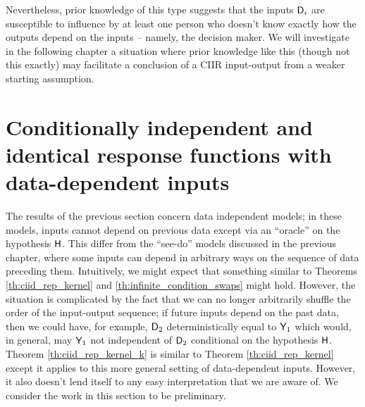 Nevertheless, prior knowledge of this type suggests that the inputs $\mathsf{D}_i$ are susceptible to influence by at least one person who doesn't know exactly how the outputs depend on the inputs -- namely, the decision maker. We will investigate in the following chapter a situation where prior knowledge like this (though not this exactly) may facilitate a conclusion of a CIIR input-output from a weaker starting assumption.

\section[Data-dependent inputs]{Conditionally independent and identical response functions with data-dependent inputs}\label{sec:data_dependent}

The results of the previous section concern data independent models; in these models, inputs cannot depend on previous data except via an ``oracle'' on the hypothesis $\mathsf{H}$. This differ from the ``see-do'' models discussed in the previous chapter, where some inputs can depend in arbitrary ways on the sequence of data preceding them. Intuitively, we might expect that something similar to Theorems \ref{th:ciid_rep_kernel} and \ref{th:infinite_condition_swaps} might hold. However, the situation is complicated by the fact that we can no longer arbitrarily shuffle the order of the input-output sequence; if future inputs depend on the past data, then we could have, for example, $\mathsf{D}_2$ deterministically equal to $\mathsf{Y}_1$ which would, in general, may $\mathsf{Y}_1$ not independent of $\mathsf{D}_2$ conditional on the hypothesis $\mathsf{H}$. Theorem \ref{th:ciid_rep_kernel_k} is similar to Theorem \ref{th:ciid_rep_kernel} except it applies to this more general setting of data-dependent inputs. However, it also doesn't lend itself to any easy interpretation that we are aware of. We consider the work in this section to be preliminary.

